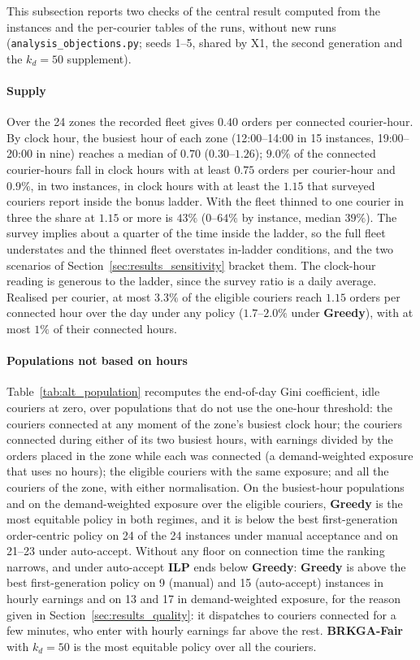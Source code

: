 \documentclass[a4paper,11pt,review,3p,authoryear]{elsarticle}
\begin{document}
This subsection reports two checks of the central result computed from the instances and the per-courier tables of the runs, without new runs (\texttt{analysis\_objections.py}; seeds 1--5, shared by X1, the second generation and the $k_d = 50$ supplement).

\paragraph{Supply} Over the 24 zones the recorded fleet gives $0.40$ orders per connected courier-hour. By clock hour, the busiest hour of each zone (12:00--14:00 in 15 instances, 19:00--20:00 in nine) reaches a median of $0.70$ ($0.30$--$1.26$); $9.0\%$ of the connected courier-hours fall in clock hours with at least $0.75$ orders per courier-hour and $0.9\%$, in two instances, in clock hours with at least the $1.15$ that surveyed couriers report inside the bonus ladder. With the fleet thinned to one courier in three the share at $1.15$ or more is $43\%$ ($0$--$64\%$ by instance, median $39\%$). The survey implies about a quarter of the time inside the ladder, so the full fleet understates and the thinned fleet overstates in-ladder conditions, and the two scenarios of Section~\ref{sec:results_sensitivity} bracket them. The clock-hour reading is generous to the ladder, since the survey ratio is a daily average. Realised per courier, at most $3.3\%$ of the eligible couriers reach $1.15$ orders per connected hour over the day under any policy ($1.7$--$2.0\%$ under \textbf{Greedy}), with at most $1\%$ of their connected hours.

\paragraph{Populations not based on hours} Table~\ref{tab:alt_population} recomputes the end-of-day Gini coefficient, idle couriers at zero, over populations that do not use the one-hour threshold: the couriers connected at any moment of the zone's busiest clock hour; the couriers connected during either of its two busiest hours, with earnings divided by the orders placed in the zone while each was connected (a demand-weighted exposure that uses no hours); the eligible couriers with the same exposure; and all the couriers of the zone, with either normalisation. On the busiest-hour populations and on the demand-weighted exposure over the eligible couriers, \textbf{Greedy} is the most equitable policy in both regimes, and it is below the best first-generation order-centric policy on 24 of the 24 instances under manual acceptance and on 21--23 under auto-accept. Without any floor on connection time the ranking narrows, and under auto-accept \textbf{ILP} ends below \textbf{Greedy}: \textbf{Greedy} is above the best first-generation policy on 9 (manual) and 15 (auto-accept) instances in hourly earnings and on 13 and 17 in demand-weighted exposure, for the reason given in Section~\ref{sec:results_quality}: it dispatches to couriers connected for a few minutes, who enter with hourly earnings far above the rest. \textbf{BRKGA-Fair} with $k_d = 50$ is the most equitable policy over all the couriers.
\end{document}
